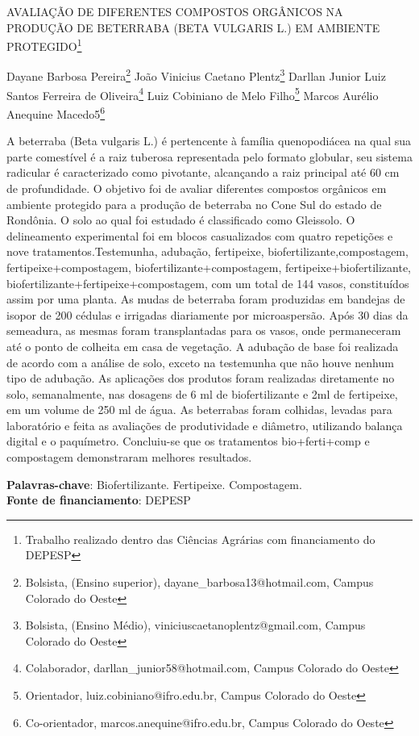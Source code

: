 \documentclass[article,12pt,onesidea,4paper,english,brazil]{abntex2}
\begin{document}
	
	
	\frenchspacing 
	
	\begin{center}
		\LARGE AVALIAÇÃO DE DIFERENTES COMPOSTOS ORGÂNICOS NA PRODUÇÃO
		DE BETERRABA (BETA VULGARIS L.) EM AMBIENTE PROTEGIDO\footnote{Trabalho realizado dentro das Ciências Agrárias com financiamento do DEPESP}
		
		\normalsize
		Dayane Barbosa Pereira\footnote{Bolsista, (Ensino superior), dayane\_barbosa13@hotmail.com, Campus Colorado do Oeste} 
		João Vinicius Caetano Plentz\footnote{Bolsista, (Ensino Médio), viniciuscaetanoplentz@gmail.com, Campus Colorado do Oeste} 
	Darllan Junior Luiz Santos Ferreira de Oliveira\footnote{Colaborador, darllan\_junior58@hotmail.com, Campus Colorado do Oeste} 
		Luiz Cobiniano de Melo Filho\footnote{Orientador, luiz.cobiniano@ifro.edu.br, Campus Colorado do Oeste}
		Marcos Aurélio Anequine Macedo5\footnote{Co-orientador, marcos.anequine@ifro.edu.br, Campus Colorado do Oeste} 
	\end{center}
	
	\noindent A beterraba (Beta vulgaris L.) é pertencente à família quenopodiácea na qual sua
	parte comestível é a raiz tuberosa representada pelo formato globular, seu sistema
	radicular é caracterizado como pivotante, alcançando a raiz principal até 60 cm de
	profundidade. O objetivo foi de avaliar diferentes compostos orgânicos em
	ambiente protegido para a produção de beterraba no Cone Sul do estado de
	Rondônia. O solo ao qual foi estudado é classificado como Gleissolo. O
	delineamento experimental foi em blocos casualizados com quatro repetições e
	nove tratamentos.Testemunha, adubação, fertipeixe, biofertilizante,compostagem,
	fertipeixe+compostagem, biofertilizante+compostagem, fertipeixe+biofertilizante,
	biofertilizante+fertipeixe+compostagem, com um total de 144 vasos, constituídos
	assim por uma planta. As mudas de beterraba foram produzidas em bandejas de
	isopor de 200 cédulas e irrigadas diariamente por microaspersão. Após 30 dias da
	semeadura, as mesmas foram transplantadas para os vasos, onde permaneceram
	até o ponto de colheita em casa de vegetação. A adubação de base foi realizada
	de acordo com a análise de solo, exceto na testemunha que não houve nenhum
	tipo de adubação. As aplicações dos produtos foram realizadas diretamente no
	solo, semanalmente, nas dosagens de 6 ml de biofertilizante e 2ml de fertipeixe,
	em um volume de 250 ml de água. As beterrabas foram colhidas, levadas para
	laboratório e feita as avaliações de produtividade e diâmetro, utilizando balança
	digital e o paquímetro. Concluiu-se que os tratamentos bio+ferti+comp e
	compostagem demonstraram melhores resultados.
	
	\vspace{\onelineskip}
	
	\noindent
	\textbf{Palavras-chave}: Biofertilizante. Fertipeixe. Compostagem. \\
	\textbf{Fonte de financiamento}: DEPESP
	
\end{document}
